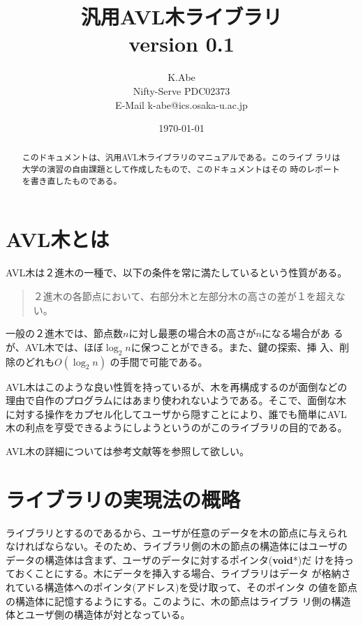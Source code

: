 \title{汎用AVL木ライブラリ\\
{\normalsize version 0.1}
}
\author{K.Abe\\Nifty-Serve PDC02373\\E-Mail k-abe@ics.osaka-u.ac.jp}
\date{\today}
\sloppy


\maketitle
\begin{abstract}
このドキュメントは、汎用AVL木ライブラリのマニュアルである。このライブ
ラリは大学の演習の自由課題として作成したもので、このドキュメントはその
時のレポートを書き直したものである。
\end{abstract}

\section{AVL木とは}
AVL木は２進木の一種で、以下の条件を常に満たしているという性質がある。

\begin{quote}
２進木の各節点において、右部分木と左部分木の高さの差が１を超えない。
\end{quote}

一般の２進木では、節点数$n$に対し最悪の場合木の高さが$n$になる場合があ
るが、AVL木では、ほぼ$\log_2{n}$に保つことができる。また、鍵の探索、挿
入、削除のどれも$O(\log_2{n})$ の手間で可能である。

AVL木はこのような良い性質を持っているが、木を再構成するのが面倒などの
理由で自作のプログラムにはあまり使われないようである。そこで、面倒な木
に対する操作をカプセル化してユーザから隠すことにより、誰でも簡単にAVL
木の利点を亨受できるようにしようというのがこのライブラリの目的である。

AVL木の詳細については参考文献\cite{data-manage}等を参照して欲しい。

\section{ライブラリの実現法の概略}
ライブラリとするのであるから、ユーザが任意のデータを木の節点に与えられ
なければならない。そのため、ライブラリ側の木の節点の構造体にはユーザの
データの構造体は含まず、ユーザのデータに対するポインタ({\bf void}*)だ
けを持っておくことにする。木にデータを挿入する場合、ライブラリはデータ
が格納されている構造体へのポインタ(アドレス)を受け取って、そのポインタ
の値を節点の構造体に記憶するようにする。このように、木の節点はライブラ
リ側の構造体とユーザ側の構造体が対となっている。

